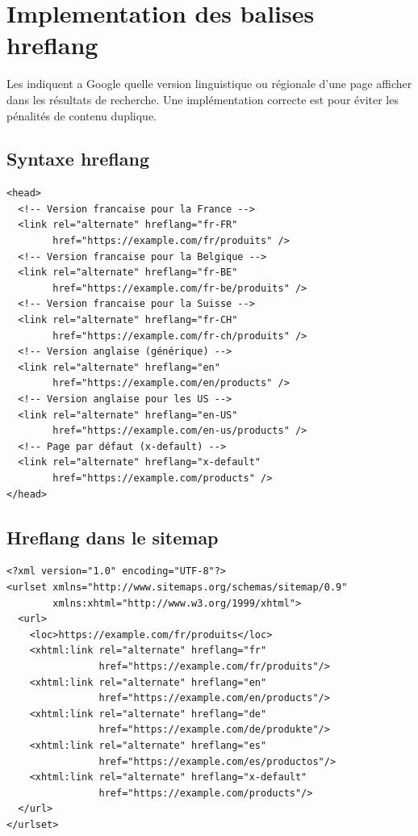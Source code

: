 \section{Implementation des balises hreflang}

Les  indiquent a Google quelle version linguistique ou régionale d'une page afficher dans les résultats de recherche. Une implémentation correcte est  pour éviter les pénalités de contenu duplique.

\subsection{Syntaxe hreflang}

\begin{lstlisting}[style=htmlcode,caption={Implementation hreflang dans le <head>}]
<head>
  <!-- Version francaise pour la France -->
  <link rel="alternate" hreflang="fr-FR"
        href="https://example.com/fr/produits" />
  <!-- Version francaise pour la Belgique -->
  <link rel="alternate" hreflang="fr-BE"
        href="https://example.com/fr-be/produits" />
  <!-- Version francaise pour la Suisse -->
  <link rel="alternate" hreflang="fr-CH"
        href="https://example.com/fr-ch/produits" />
  <!-- Version anglaise (générique) -->
  <link rel="alternate" hreflang="en"
        href="https://example.com/en/products" />
  <!-- Version anglaise pour les US -->
  <link rel="alternate" hreflang="en-US"
        href="https://example.com/en-us/products" />
  <!-- Page par défaut (x-default) -->
  <link rel="alternate" hreflang="x-default"
        href="https://example.com/products" />
</head>
\end{lstlisting}

\subsection{Hreflang dans le sitemap}

\begin{lstlisting}[style=htmlcode,caption={Declaration hreflang dans le sitemap XML}]
<?xml version="1.0" encoding="UTF-8"?>
<urlset xmlns="http://www.sitemaps.org/schemas/sitemap/0.9"
        xmlns:xhtml="http://www.w3.org/1999/xhtml">
  <url>
    <loc>https://example.com/fr/produits</loc>
    <xhtml:link rel="alternate" hreflang="fr"
                href="https://example.com/fr/produits"/>
    <xhtml:link rel="alternate" hreflang="en"
                href="https://example.com/en/products"/>
    <xhtml:link rel="alternate" hreflang="de"
                href="https://example.com/de/produkte"/>
    <xhtml:link rel="alternate" hreflang="es"
                href="https://example.com/es/productos"/>
    <xhtml:link rel="alternate" hreflang="x-default"
                href="https://example.com/products"/>
  </url>
</urlset>
\end{lstlisting}

